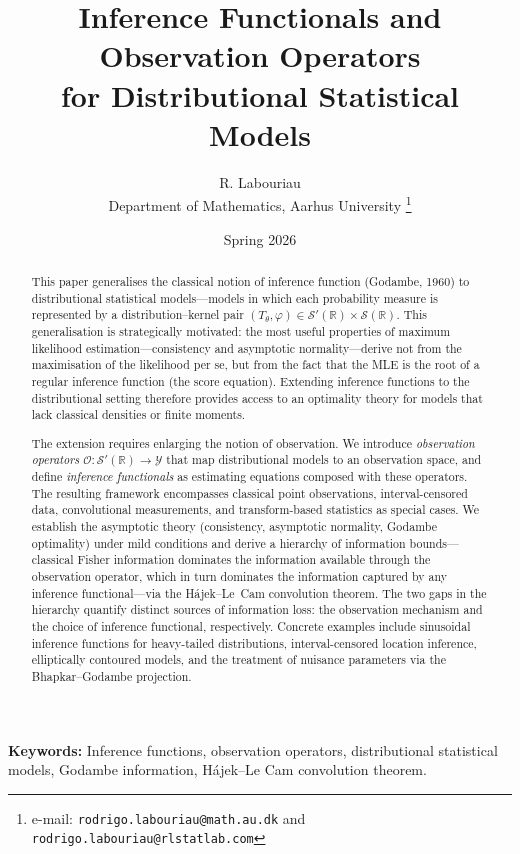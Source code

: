 \documentclass[11pt,a4paper]{article}
\title{Inference Functionals and Observation Operators \\
for Distributional Statistical Models}
\author{
R. Labouriau\\ [0.3em]
\small Department of Mathematics, Aarhus University
\footnote{e-mail:
\Fnine \texttt{rodrigo.labouriau@math.au.dk} and 
\Fnine \texttt{rodrigo.labouriau@rlstatlab.com}}}
\date{Spring 2026}
\newcommand{\Feight} {\fontsize{8}{11}\selectfont  }
\newcommand{\Fnine} {\fontsize{9}{11}\selectfont  }
\begin{document}
\maketitle

\begin{abstract}\Feight
This paper generalises the classical notion of inference function
(Godambe, 1960) to distributional statistical models---models in which
each probability measure is represented by a distribution--kernel pair
$(T_\theta, \varphi) \in \mathcal S'(\mathbb R) \times
\mathcal S(\mathbb R)$.  This generalisation is strategically motivated:
the most useful properties of maximum likelihood estimation---consistency
and asymptotic normality---derive not from the maximisation of the
likelihood per se, but from the fact that the MLE is the root of a regular
inference function (the score equation).  Extending inference functions to
the distributional setting therefore provides access to an optimality
theory for models that lack classical densities or finite moments.

The extension requires enlarging the notion of observation.  We introduce
\emph{observation operators}
$\mathcal O : \mathcal S'(\mathbb R) \to \mathcal Y$ that map distributional
models to an observation space, and define \emph{inference functionals} as
estimating equations composed with these operators.  The resulting framework
encompasses classical point observations, interval-censored data,
convolutional measurements, and transform-based statistics as special cases.
We establish the asymptotic theory (consistency, asymptotic normality,
Godambe optimality) under mild conditions and derive a hierarchy of
information bounds---classical Fisher information dominates the
information available through the observation operator, which in turn
dominates the information captured by any inference functional---via the
H\'ajek--Le~Cam convolution theorem.  The two gaps in the hierarchy
quantify distinct sources of information loss: the observation mechanism
and the choice of inference functional, respectively.
Concrete examples include sinusoidal
inference functions for heavy-tailed distributions, interval-censored
location inference, elliptically contoured models, and the treatment of
nuisance parameters via the Bhapkar--Godambe projection.
 \end{abstract}

\smallskip
\noindent
\textbf{\Fnine Keywords:} \Feight Inference functions, observation operators, distributional statistical models, Godambe information,  Hájek–Le Cam convolution theorem.
\end{document}
